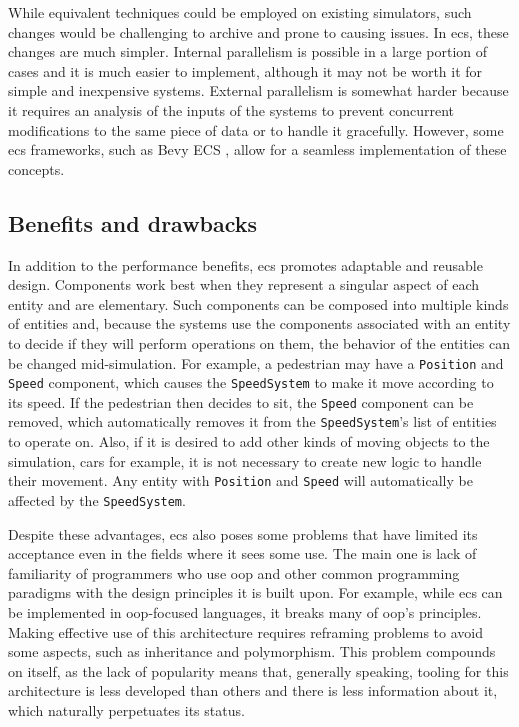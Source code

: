 \documentclass[twoside, 11pt]{article}
\begin{document}
While equivalent techniques could be employed on existing simulators, such changes would be challenging to archive and prone to causing issues. In \gls{ecs}, these changes are much simpler. Internal parallelism is possible in a large portion of cases and it is much easier to implement, although it may not be worth it for simple and inexpensive systems. External parallelism is somewhat harder because it requires an analysis of the inputs of the systems to prevent concurrent modifications to the same piece of data or to handle it gracefully. However, some \gls{ecs} frameworks, such as Bevy ECS \cite{bevy}, allow for a seamless implementation of these concepts.

\subsection{Benefits and drawbacks}

In addition to the performance benefits, \gls{ecs} promotes adaptable and reusable design. Components work best when they represent a singular aspect of each entity and are elementary. Such components can be composed into multiple kinds of entities and, because the systems use the components associated with an entity to decide if they will perform operations on them, the behavior of the entities can be changed mid-simulation. For example, a pedestrian may have a \verb|Position| and \verb|Speed| component, which causes the \verb|SpeedSystem| to make it move according to its speed. If the pedestrian then decides to sit, the \verb|Speed| component can be removed, which automatically removes it from the \verb|SpeedSystem|'s list of entities to operate on. Also, if it is desired to add other kinds of moving objects to the simulation, cars for example, it is not necessary to create new logic to handle their movement. Any entity with \verb|Position| and \verb|Speed| will automatically be affected by the \verb|SpeedSystem|.

Despite these advantages, \gls{ecs} also poses some problems that have limited its acceptance even in the fields where it sees some use. The main one is lack of familiarity of programmers who use \gls{oop} and other common programming paradigms with the design principles it is built upon. For example, while \gls{ecs} can be implemented in \gls{oop}-focused languages, it breaks many of \gls{oop}'s principles. Making effective use of this architecture requires reframing problems to avoid some aspects, such as inheritance and polymorphism. This problem compounds on itself, as the lack of popularity means that, generally speaking, tooling for this architecture is less developed than others and there is less information about it, which naturally perpetuates its status.
\end{document}
